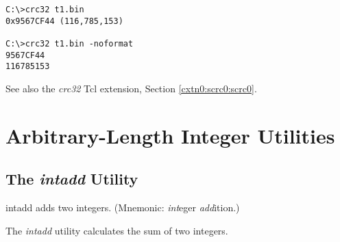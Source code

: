 \begin{dosutilcommandsampleinvocations}
\begin{scriptsize}
\begin{verbatim}
C:\>crc32 t1.bin
0x9567CF44 (116,785,153)

C:\>crc32 t1.bin -noformat
9567CF44
116785153
\end{verbatim}
\end{scriptsize}
\end{dosutilcommandsampleinvocations}

\begin{dosutilcommandseealso}
See also the \emph{crc32} Tcl extension, 
Section \ref{cxtn0:scrc0:scrc0}.
\end{dosutilcommandseealso}


\section{Arbitrary-Length Integer Utilities}
\label{cdcm0:sali0}


\subsection{The \emph{intadd} Utility}
\label{cdcm0:sali0:sadd0}

\begin{dosutilcommandname}{intadd}%
adds two integers.  (Mnemonic:  \emph{int}eger
\emph{add}ition.)
\end{dosutilcommandname}

\begin{dosutilcommandsynopsis}
\end{dosutilcommandsynopsis}

\begin{dosutilcommanddescription}
The \emph{intadd} utility calculates the sum of two integers.
\end{dosutilcommanddescription}

